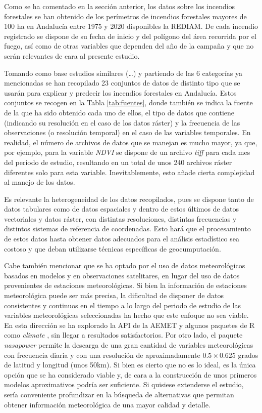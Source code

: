 \documentclass[12pt,a4paper,]{book}
\numberwithin{dummy}{section}
\theoremstyle{ocrenumbox}
\theoremstyle{blacknumex}
\theoremstyle{blacknumbox}
\theoremstyle{ocrenum}
\theoremstyle{ocrenum}
\begin{document}
Como se ha comentado en la sección anterior, los datos sobre los
incendios forestales se han obtenido de los perímetros de incendios
forestales mayores de 100 ha en Andalucía entre 1975 y 2020 disponibles
la REDIAM. De cada incendio registrado se dispone de su fecha de inicio
y del polígono del área recorrida por el fuego, así como de otras
variables que dependen del año de la campaña y que no serán relevantes
de cara al presente estudio.

Tomando como base estudios similares (\ldots) y partiendo de las 6
categorías ya mencionadas se han recopilado 23 conjuntos de datos de
distinto tipo que se usarán para explicar y predecir los incendios
forestales en Andalucía. Estos conjuntos se recogen en la Tabla
\ref{tab:fuentes}, donde también se indica la fuente de la que ha sido
obtenido cada uno de ellos, el tipo de datos que contiene (indicando su
resolución en el caso de los datos ráster) y la frecuencia de las
observaciones (o resolución temporal) en el caso de las variables
temporales. En realidad, el número de archivos de datos que se manejan
es mucho mayor, ya que, por ejemplo, para la variable \emph{NDVI} se
dispone de un archivo \emph{tiff} para cada mes del periodo de estudio,
resultando en un total de unos 240 archivos ráster diferentes solo para
esta variable. Inevitablemente, esto añade cierta complejidad al manejo
de los datos.

Es relevante la heterogeneidad de los datos recopilados, pues se dispone
tanto de datos tabulares como de datos espaciales y dentro de estos
últimos de datos vectoriales y datos ráster, con distintas resoluciones,
distintas frecuencias y distintos sistemas de referencia de coordenadas.
Esto hará que el procesamiento de estos datos hasta obtener datos
adecuados para el análisis estadístico sea costoso y que deban
utilizarse técnicas específicas de geocumputación.

Cabe también mencionar que se ha optado por el uso de datos
meteorológicos basados en modelos y en observaciones satelitares, en
lugar del uso de datos provenientes de estaciones meteorológicas. Si
bien la información de estaciones meteorológica puede ser más precisa,
la dificultad de disponer de datos consistentes y continuos en el tiempo
a lo largo del periodo de estudio de las variables meteorológicas
seleccionadas ha hecho que este enfoque no sea viable. En esta dirección
se ha explorado la API de la AEMET y algunos paquetes de R como
\emph{climate} \citep{climate}, sin llegar a resultados satisfactorios.
Por otro lado, el paquete \emph{nasapower}\citep{nasapower} permite la
descarga de una gran cantidad de variables meteorológicas con frecuencia
diaria y con una resolución de aproximadamente \(0.5 \times 0.625\)
grados de latitud y longitud (unos 50km). Si bien es cierto que no es lo
ideal, es la única opción que se ha considerado viable y, de cara a la
construcción de unos primeros modelos aproximativos podría ser
suficiente. Si quisiese extenderse el estudio, sería conveniente
profundizar en la búsqueda de alternativas que permitan obtener
información meteorológica de una mayor calidad y detalle.
\end{document}
